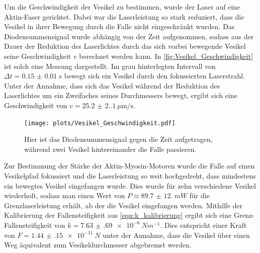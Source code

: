     Um die Geschwindigkeit der Vesikel zu bestimmen, wurde der Laser auf eine Aktin-Faser gerichtet.
    Dabei war die Laserleistung so stark reduziert, dass die Vesikel in ihrer Bewegung durch die Falle nicht eingeschränkt wurden.
    Das Diodensummensignal wurde abhängig von der Zeit aufgenommen, sodass aus der Dauer der Reduktion des Laserlichtes durch das sich vorbei bewegende Vesikel seine Geschwindigkeit $v$ berechnet werden kann.
    In \autoref{fig:Vesikel_Geschwindigkeit} ist solch eine Messung dargestellt.
    Im grau hinterlegten Intervall von $\Delta t = \qty{0.15(1)}{s}$ bewegt sich ein Vesikel durch den fokussierten Laserstrahl.
    Unter der Annahme, dass sich das Vesikel während der Reduktion des Laserlichtes um ein Zweifaches seines Durchmessers bewegt, ergibt sich eine Geschwindigkeit von $v = \qty{25.2(2.1)}{\um \per \second}$.
    \begin{figure}[ht]
        \centering\captionsetup{format=plain}
        \texttt{[image: plots/Vesikel\_Geschwindigkeit.pdf]} \vspace*{-0.5cm}
        \caption{Hier ist das Diodensummensignal gegen die Zeit aufgetragen, während zwei Vesikel hintereinander die Falle passieren.}
        \label{fig:Vesikel_Geschwindigkeit}
    \end{figure}
    \FloatBarrier

    Zur Bestimmung der Stärke der Aktin-Myosin-Motoren wurde die Falle auf einen Vesikelpfad fokussiert und die Laserleistung so weit hochgedreht, dass mindestens ein bewegtes Vesikel eingefangen wurde.
    Dies wurde für zehn verschiedene Vesikel wiederholt, sodass man einen Wert von $P \approx \qty{89.7(12.0)}{mW}$ für die Grenzlaserleistung erhält, ab der die Vesikel eingefangen werden.
    Mithilfe der Kalibrierung der Fallensteifigkeit aus \autoref{eqn:k_kalibrierung} ergibt sich eine Grenz-Fallensteifigkeit von $k = \qty{7.63(69)e-6}{N m^{-1}}$.
    Dies entspricht einer Kraft von $F = \qty{1.44(15)e-11}{N}$ unter der Annahme, dass die Vesikel über einen Weg äquivalent zum Vesikeldurchmesser abgebremst werden.
    


